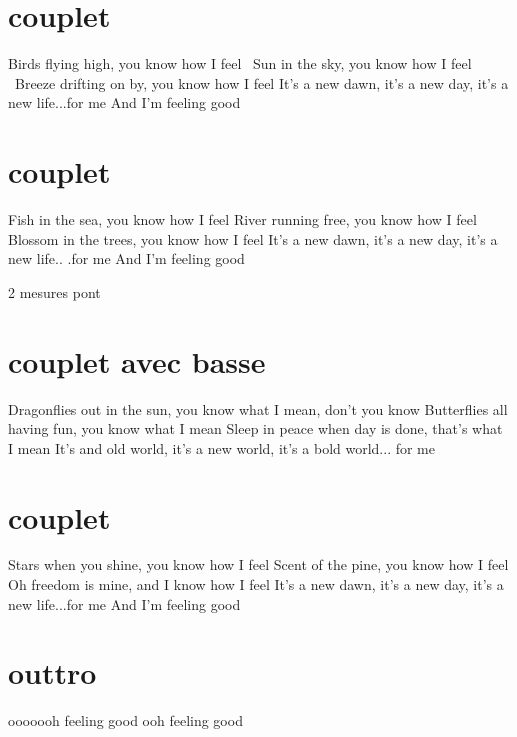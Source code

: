 \section*{couplet}
Birds flying high, you know how I feel \
Sun in the sky, you know how I feel \
Breeze drifting on by, you know how I feel
It's a new dawn, it's a new day, it's a new life...for me
And I'm feeling good


\section*{couplet}
Fish in the sea, you know how I feel
River running free, you know how I feel
Blossom in the trees, you know how I feel
It's a new dawn, it's a new day, it's a new life..  .for me
And I'm feeling good

2 mesures pont

\section*{couplet avec basse}

Dragonflies out in the sun, you know what I mean, don't you know
Butterflies all having fun, you know what I mean
Sleep in peace when day is done, that's what I mean
It's and old world, it's a new world, it's a bold world...  for me

\section*{couplet}
Stars when you shine, you know how I feel
Scent of the pine, you know how I feel
Oh freedom is mine, and I know how I feel
It's a new dawn, it's a new day, it's a new life...for me
And I'm feeling good

\section*{outtro}
ooooooh feeling good ooh feeling good
